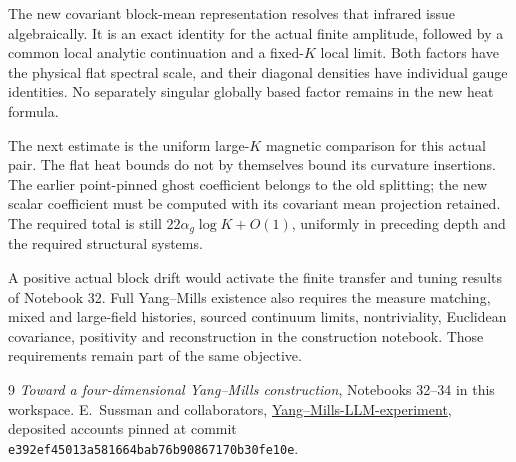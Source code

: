 \documentclass[11pt]{article}
\theoremstyle{remark}
\begin{document}
The new covariant block-mean representation resolves
that infrared issue algebraically. It is an exact
identity for the actual finite amplitude, followed
by a common local analytic continuation and a
fixed-\(K\) local limit. Both factors have the
physical flat spectral scale, and their diagonal
densities have individual gauge identities.
No separately singular globally based factor
remains in the new heat formula.

The next estimate is the uniform large-\(K\)
magnetic comparison for this actual pair. The
flat heat bounds do not by themselves bound
its curvature insertions. The earlier point-pinned
ghost coefficient belongs to the old splitting;
the new scalar coefficient must be computed
with its covariant mean projection retained.
The required total is still
\(22\alpha_g\log K+O(1)\), uniformly in preceding
depth and the required structural systems.

A positive actual block drift would activate the
finite transfer and tuning results of Notebook 32.
Full Yang--Mills existence also requires the
measure matching, mixed and large-field histories,
sourced continuum limits, nontriviality, Euclidean
covariance, positivity and reconstruction in the
construction notebook. Those requirements remain
part of the same objective.

\begin{thebibliography}{9}
\emph{Toward a four-dimensional Yang--Mills construction},
Notebooks 32--34 in this workspace.
E.~Sussman and collaborators,
\href{https://github.com/ethanwsussman/Yang--Mills-LLM-experiment}
{Yang--Mills-LLM-experiment}, deposited accounts pinned at
commit \texttt{e392ef4501\allowbreak 3a581664ba\allowbreak b76b908671\allowbreak 70b30fe10e}.
\end{thebibliography}
\end{document}
